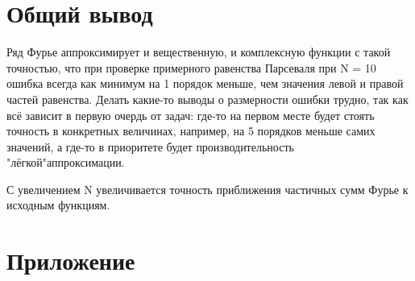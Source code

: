 \documentclass[a4paper, 12pt]{article}
\begin{document}
\newpage
\section{Общий вывод}
Ряд Фурье аппроксимирует и вещественную, и комплексную функции с такой точностью, что при проверке примерного равенства Парсеваля при N = 10 ошибка всегда как минимум на 1 порядок меньше, чем значения левой и правой частей равенства. Делать какие-то выводы о размерности ошибки трудно, так как всё зависит в первую очердь от задач: где-то на первом месте будет стоять точность в конкретных величинах, например, на 5 порядков меньше самих значений, а где-то в приоритете будет производительность "лёгкой"\;аппроксимации.

С увеличением N увеличивается точность приближения частичных сумм Фурье к исходным функциям.


\newpage
\section{Приложение}
\end{document}
